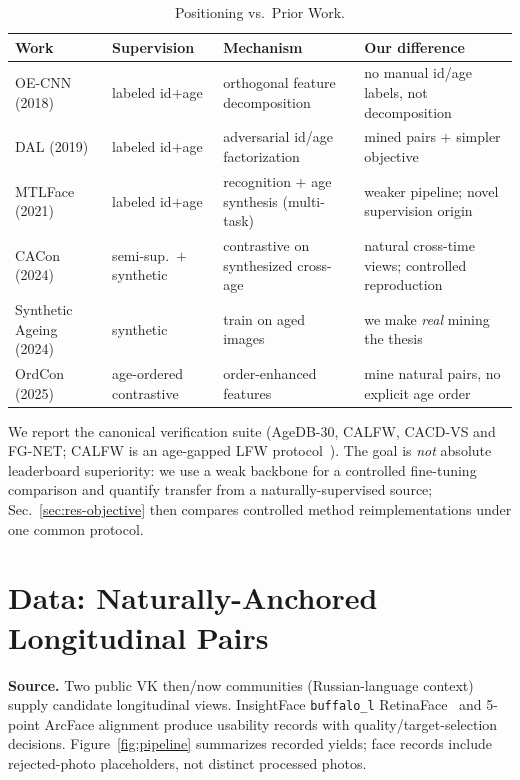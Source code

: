 \documentclass[journal]{IEEEtran}
\begin{document}
\begin{table}[!t]
\renewcommand{\arraystretch}{1.25}
\caption{Positioning vs.\ Prior Work.}
\label{tab:positioning}
\centering
\footnotesize
\begin{tabular}{@{}p{}p{}p{}p{}@{}}
\toprule
Work & Supervision & Mechanism & Our difference \\
\midrule
OE-CNN (2018)~\cite{wang2018oecnn} & labeled id$+$age & orthogonal feature decomposition & no manual id/age labels, not decomposition \\
DAL (2019)~\cite{wang2019dal} & labeled id$+$age & adversarial id/age factorization & mined pairs $+$ simpler objective \\
MTLFace (2021)~\cite{huang2021mtlface} & labeled id$+$age & recognition $+$ age synthesis (multi-task) & weaker pipeline; novel supervision origin \\
CACon (2024)~\cite{wang2024cacon} & semi-sup.\ $+$ synthetic & contrastive on synthesized cross-age & natural cross-time views; controlled reproduction \\
Synthetic Ageing (2024)~\cite{yao2024synthageing} & synthetic & train on aged images & we make \emph{real} mining the thesis \\
OrdCon (2025)~\cite{wang2025ordcon} & age-ordered contrastive & order-enhanced features & mine natural pairs, no explicit age order \\
\bottomrule
\end{tabular}
\end{table}

We report the canonical verification suite (AgeDB-30, CALFW, CACD-VS and FG-NET; CALFW is an
age-gapped LFW protocol~\cite{huang2007lfw}). The goal is \emph{not} absolute leaderboard superiority:
we use a weak backbone for a controlled fine-tuning comparison and quantify transfer from a naturally-supervised
source; Sec.~\ref{sec:res-objective} then compares controlled method reimplementations under one common protocol.

\section{Data: Naturally-Anchored Longitudinal Pairs}\label{sec:data}
\textbf{Source.} Two public VK then/now communities (Russian-language context) supply candidate longitudinal views. InsightFace \texttt{buffalo\_l} RetinaFace~\cite{deng2020retinaface} and 5-point ArcFace alignment produce usability records with quality/target-selection decisions. Figure~\ref{fig:pipeline} summarizes recorded yields; face records include rejected-photo placeholders, not distinct processed photos.
\end{document}
